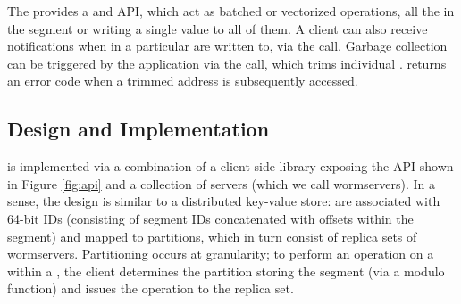 The \WOS{} provides a \api{\prepare{}} and  API, which act as batched or vectorized operations, \preparing{} all the \WORs{} in the segment or writing a single value to all of them.
A client can also receive notifications when \WORs{} in a particular \WOS{} are written to, via the  call.
Garbage collection can be triggered by the application via the  call, which trims individual \WOSes{}. \sysname{} returns an error code when a trimmed address is subsequently accessed.






\subsection{Design and Implementation}

\sysname{} is implemented via a combination of a client-side library exposing the API shown in Figure \ref{fig:api} and a collection of servers (which we call wormservers). In a sense, the \sysname{} design is similar to a distributed key-value store: \WORs{} are associated with 64-bit IDs (consisting of segment IDs concatenated with offsets within the segment) and mapped to partitions, which in turn consist of replica sets of wormservers. Partitioning occurs at \WOS{} granularity; to perform an operation on a \WOR{} within a \WOS{}, the client determines the partition storing the segment (via a modulo function) and issues the operation to the replica set.

